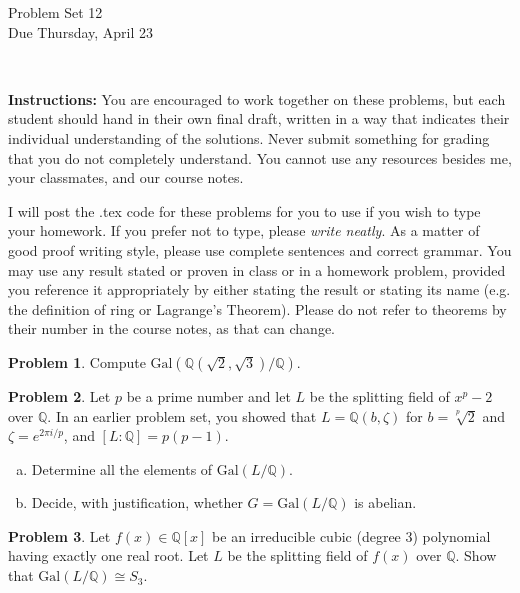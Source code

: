 \documentclass[11pt]{article}
\title{}
\date{\vspace{-0.5in}}
\newcommand{\Q}{\mathbb{Q}}
\theoremstyle{definition}
\newtheorem{problem}{Problem}
\begin{document}
\thispagestyle{fancy}
\pagestyle{fancy}

\vspace{3em}

\begin{center}
	{\LARGE Problem Set 12 \\}
	Due Thursday, April 23\end{center}

\

\noindent
{\bf Instructions:}
You are encouraged to work together on these problems, but each student should hand in their own final draft, written in a way that indicates their individual understanding of the solutions. Never submit something for grading that you do not completely understand. You cannot use any resources besides me, your classmates, and our course notes.


I will post the .tex code for these problems for you to use if you wish to type your homework. If you prefer not to type, please  {\em write neatly}. As a matter of good proof writing style, please use complete sentences and correct grammar. You may use any result stated or proven in class or in a homework problem, provided you reference it appropriately by either stating the result or stating its name (e.g. the definition of ring or Lagrange's Theorem). Please do not refer to theorems by their number in the course notes, as that can change.



\begin{problem}
	Compute $\mathrm{Gal}(\Q(\sqrt{2},\sqrt{3})/\Q)$.
\end{problem}

\begin{problem}
Let $p$ be a prime number and let $L$ be the splitting field of $x^p-2$ over $\Q$. In an earlier problem set, you showed that $L = \Q(b,\zeta)$ for $b = \sqrt[p]{2}$ and $\zeta = e^{2\pi i/p}$, and $[L : \Q] = p(p-1)$.
\begin{enumerate}[(a)]
\item  Determine all the elements of $\mathrm{Gal}(L/\Q)$.

\item Decide, with justification, whether $G=\mathrm{Gal}(L/\Q)$ is abelian.
\end{enumerate}
\end{problem}

\begin{problem}
	Let $f(x) \in \Q[x]$ be an irreducible cubic (degree $3$) polynomial having exactly one real root. 
Let $L$ be the splitting field of $f(x)$ over $\Q$. Show that $\mathrm{Gal}(L/\Q) \cong S_3$.
\end{problem}
\end{document}
